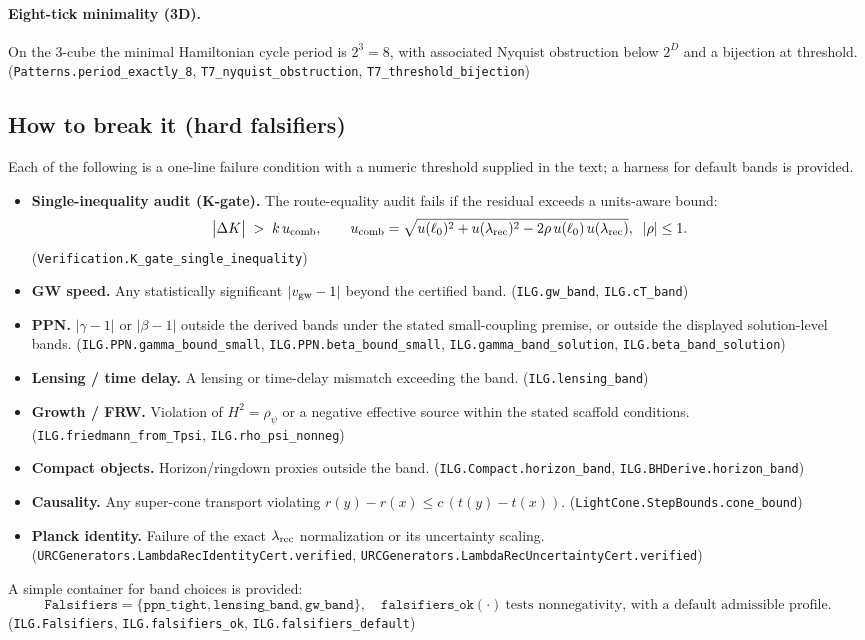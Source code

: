 \documentclass[12pt,a4paper]{article}
\begin{document}
\paragraph{Eight-tick minimality (3D).}
On the 3-cube the minimal Hamiltonian cycle period is \(2^3=8\), with associated Nyquist obstruction below \(2^D\) and a bijection at threshold.
\hfill(\texttt{Patterns.period\_exactly\_8}, \texttt{T7\_nyquist\_obstruction}, \texttt{T7\_threshold\_bijection})

\subsection{How to break it (hard falsifiers)}
Each of the following is a one-line failure condition with a numeric threshold supplied in the text; a harness for default bands is provided. 
\begin{itemize}
  \item \textbf{Single-inequality audit (K-gate).} The route-equality audit fails if the residual exceeds a units-aware bound:
  \[
  \bigl|\Delta K\bigr| \;>\; k\,u_{\rm comb},\qquad
  u_{\rm comb}=\sqrt{u(\ell_0)^2+u(\lambda_{\rm rec})^2-2\rho\,u(\ell_0)\,u(\lambda_{\rm rec})},\;\;|\rho|\le 1.
  \]
  \hfill(\texttt{Verification.K\_gate\_single\_inequality})
  \item \textbf{GW speed.} Any statistically significant \( |v_{\rm gw}-1| \) beyond the certified band. \hfill(\texttt{ILG.gw\_band}, \texttt{ILG.cT\_band})
  \item \textbf{PPN.} \( |\gamma-1| \) or \( |\beta-1| \) outside the derived bands under the stated small-coupling premise, or outside the displayed solution-level bands. \hfill(\texttt{ILG.PPN.gamma\_bound\_small}, \texttt{ILG.PPN.beta\_bound\_small}, \texttt{ILG.gamma\_band\_solution}, \texttt{ILG.beta\_band\_solution})
  \item \textbf{Lensing / time delay.} A lensing or time-delay mismatch exceeding the band. \hfill(\texttt{ILG.lensing\_band})
  \item \textbf{Growth / FRW.} Violation of \(H^2=\rho_\psi\) or a negative effective source within the stated scaffold conditions. \hfill(\texttt{ILG.friedmann\_from\_Tpsi}, \texttt{ILG.rho\_psi\_nonneg})
  \item \textbf{Compact objects.} Horizon/ringdown proxies outside the band. \hfill(\texttt{ILG.Compact.horizon\_band}, \texttt{ILG.BHDerive.horizon\_band})
  \item \textbf{Causality.} Any super-cone transport violating \(r(y)-r(x)\le c\,(t(y)-t(x))\). \hfill(\texttt{LightCone.StepBounds.cone\_bound})
  \item \textbf{Planck identity.} Failure of the exact \(\lambda_{\rm rec}\) normalization or its uncertainty scaling. \hfill(\texttt{URCGenerators.LambdaRecIdentityCert.verified}, \texttt{URCGenerators.LambdaRecUncertaintyCert.verified})
\end{itemize}
A simple container for band choices is provided:
\[
\texttt{Falsifiers}=\{\texttt{ppn\_tight},\texttt{lensing\_band},\texttt{gw\_band}\},\quad
\texttt{falsifiers\_ok}(\cdot)\ \text{tests nonnegativity, with a default admissible profile.}
\]
\hfill(\texttt{ILG.Falsifiers}, \texttt{ILG.falsifiers\_ok}, \texttt{ILG.falsifiers\_default})
\end{document}
